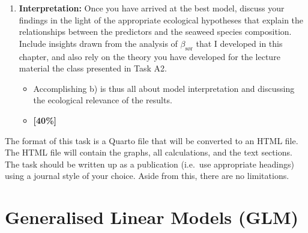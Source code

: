 \documentclass[
  letterpaper,
]{book}
\providecommand{\tightlist}{%
  \setlength{\itemsep}{0pt}\setlength{\parskip}{0pt}}\usepackage{longtable,booktabs,array}
\begin{document}
\begin{tcolorbox}
\begin{enumerate}
\begin{itemize}
    \begin{itemize}
    \tightlist
    \item
      Data exploration and visualisation (EDA)
    \item
      Model building (providing hypothesis statements, variable
      selection using VIF and forward selection, comparisons of nested
      models, justifications for model selection)
    \item
      Model diagnostics
    \item
      Explanation of \texttt{summary()} and \texttt{anova()} outputs
    \item
      Producing the Results section
    \item
      \textbf{{[}60\%{]}}
    \end{itemize}
  \end{itemize}
\item
  \textbf{Interpretation:} Once you have arrived at the best model,
  discuss your findings in the light of the appropriate ecological
  hypotheses that explain the relationships between the predictors and
  the seaweed species composition. Include insights drawn from the
  analysis of \(\beta_\text{sør}\) that I developed in this chapter, and
  also rely on the theory you have developed for the lecture material
  the class presented in Task A2.

  \begin{itemize}
  \tightlist
  \item
    Accomplishing b) is thus all about model interpretation and
    discussing the ecological relevance of the results.
  \item
    \textbf{{[}40\%{]}}
  \end{itemize}
\end{enumerate}

The format of this task is a Quarto file that will be converted to an
HTML file. The HTML file will contain the graphs, all calculations, and
the text sections. The task should be written up as a publication
(i.e.~use appropriate headings) using a journal style of your choice.
Aside from this, there are no limitations.

\end{tcolorbox}

\chapter{Generalised Linear Models
(GLM)}\label{sec-generalised-linear-model}
\end{document}
